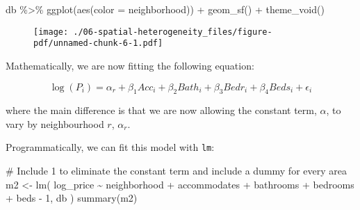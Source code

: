 \documentclass[
  letterpaper,
  krantz2]{style/krantz}
\newenvironment{Shaded}{\begin{snugshade}}{\end{snugshade}}
\newcommand{\AttributeTok}[1]{\textcolor[rgb]{0.40,0.45,0.13}{#1}}
\newcommand{\CommentTok}[1]{\textcolor[rgb]{0.37,0.37,0.37}{#1}}
\newcommand{\FunctionTok}[1]{\textcolor[rgb]{0.28,0.35,0.67}{#1}}
\newcommand{\NormalTok}[1]{\textcolor[rgb]{0.00,0.23,0.31}{#1}}
\newcommand{\OtherTok}[1]{\textcolor[rgb]{0.00,0.23,0.31}{#1}}
\newcommand{\SpecialCharTok}[1]{\textcolor[rgb]{0.37,0.37,0.37}{#1}}
\newcommand{\StringTok}[1]{\textcolor[rgb]{0.13,0.47,0.30}{#1}}
\begin{document}
\begin{Shaded}
\begin{Highlighting}[]
\NormalTok{db }\SpecialCharTok{\%\textgreater{}\%}
  \FunctionTok{ggplot}\NormalTok{(}\FunctionTok{aes}\NormalTok{(}\AttributeTok{color =}\NormalTok{ neighborhood)) }\SpecialCharTok{+}
  \FunctionTok{geom\_sf}\NormalTok{() }\SpecialCharTok{+} 
  \FunctionTok{theme\_void}\NormalTok{()}
\end{Highlighting}
\end{Shaded}

\begin{figure}[H]

{\centering \texttt{[image: ./06-spatial-heterogeneity\_files/figure-pdf/unnamed-chunk-6-1.pdf]}

}

\end{figure}

Mathematically, we are now fitting the following equation:

\[
\log(P_i) = \alpha_r + \beta_1 Acc_i + \beta_2 Bath_i + \beta_3 Bedr_i + \beta_4 Beds_i + \epsilon_i
\]

where the main difference is that we are now allowing the constant term,
\(\alpha\), to vary by neighbourhood \(r\), \(\alpha_r\).

Programmatically, we can fit this model with \texttt{lm}:

\begin{Shaded}
\begin{Highlighting}[]
\CommentTok{\# Include \textasciigrave{}{-}1\textasciigrave{} to eliminate the constant term and include a dummy for every area}
\NormalTok{m2 }\OtherTok{\textless{}{-}} \FunctionTok{lm}\NormalTok{(}
  \StringTok{\textquotesingle{}log\_price \textasciitilde{} neighborhood + accommodates + bathrooms + bedrooms + beds {-} 1\textquotesingle{}}\NormalTok{, }
\NormalTok{  db}
\NormalTok{)}
\FunctionTok{summary}\NormalTok{(m2)}
\end{Highlighting}
\end{Shaded}
\end{document}
